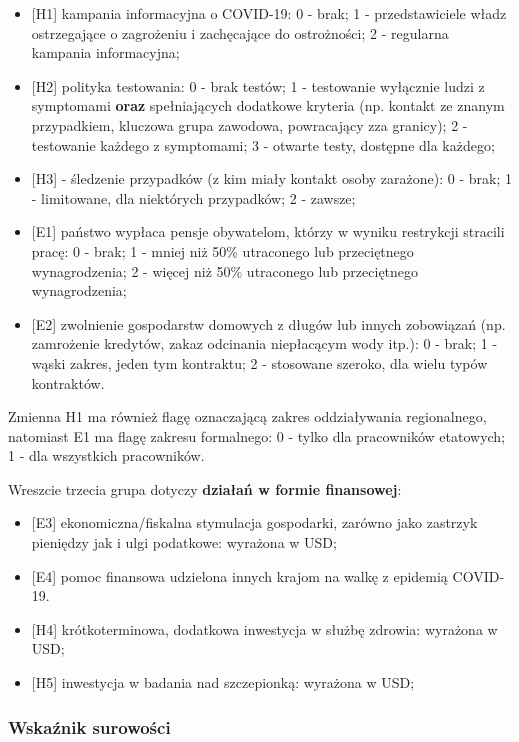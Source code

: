 \documentclass[
]{article}
\providecommand{\tightlist}{%
  \setlength{\itemsep}{0pt}\setlength{\parskip}{0pt}}
\begin{document}
\begin{itemize}
\tightlist
\item
  {[}H1{]} kampania informacyjna o COVID-19: 0 - brak; 1 -
  przedstawiciele władz ostrzegające o zagrożeniu i zachęcające do
  ostrożności; 2 - regularna kampania informacyjna;
\item
  {[}H2{]} polityka testowania: 0 - brak testów; 1 - testowanie
  wyłącznie ludzi z symptomami \textbf{oraz} spełniających dodatkowe
  kryteria (np. kontakt ze znanym przypadkiem, kluczowa grupa zawodowa,
  powracający zza granicy); 2 - testowanie każdego z symptomami; 3 -
  otwarte testy, dostępne dla każdego;
\item
  {[}H3{]} - śledzenie przypadków (z kim miały kontakt osoby zarażone):
  0 - brak; 1 - limitowane, dla niektórych przypadków; 2 - zawsze;
\item
  {[}E1{]} państwo wypłaca pensje obywatelom, którzy w wyniku restrykcji
  stracili pracę: 0 - brak; 1 - mniej niż 50\% utraconego lub
  przeciętnego wynagrodzenia; 2 - więcej niż 50\% utraconego lub
  przeciętnego wynagrodzenia;
\item
  {[}E2{]} zwolnienie gospodarstw domowych z długów lub innych
  zobowiązań (np. zamrożenie kredytów, zakaz odcinania niepłacącym wody
  itp.): 0 - brak; 1 - wąski zakres, jeden tym kontraktu; 2 - stosowane
  szeroko, dla wielu typów kontraktów.
\end{itemize}

Zmienna H1 ma również flagę oznaczającą zakres oddziaływania
regionalnego, natomiast E1 ma flagę zakresu formalnego: 0 - tylko dla
pracowników etatowych; 1 - dla wszystkich pracowników.

Wreszcie trzecia grupa dotyczy \textbf{działań w formie finansowej}:

\begin{itemize}
\tightlist
\item
  {[}E3{]} ekonomiczna/fiskalna stymulacja gospodarki, zarówno jako
  zastrzyk pieniędzy jak i ulgi podatkowe: wyrażona w USD;
\item
  {[}E4{]} pomoc finansowa udzielona innych krajom na walkę z epidemią
  COVID-19.
\item
  {[}H4{]} krótkoterminowa, dodatkowa inwestycja w służbę zdrowia:
  wyrażona w USD;
\item
  {[}H5{]} inwestycja w badania nad szczepionką: wyrażona w USD;
\end{itemize}

\hypertarget{wskaux17anik-surowoux15bci}{%
\subsubsection{Wskaźnik surowości}\label{wskaux17anik-surowoux15bci}}
\end{document}
